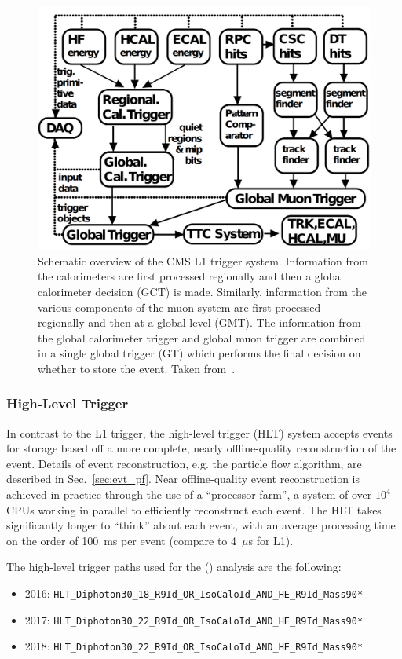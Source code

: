 \begin{figure} [htbp!]
    \centering
    \includegraphics[width=0.6\linewidth]{figures/cms/cms_l1_trigger.png}
    \caption[Schematic overview of the CMS L1 trigger system. Taken from~\cite{Khachatryan:2016bia}.]{Schematic overview of the CMS L1 trigger system. Information from the calorimeters are first processed regionally and then a global calorimeter decision (GCT) is made. Similarly, information from the various components of the muon system are first processed regionally and then at a global level (GMT). The information from the global calorimeter trigger and global muon trigger are combined in a single global trigger (GT) which performs the final decision on whether to store the event. Taken from~\cite{Khachatryan:2016bia}.}
    \label{fig:cms_l1_trigger}
\end{figure}

\subsubsection{High-Level Trigger}
In contrast to the L1 trigger, the high-level trigger (HLT) system accepts events for storage based off a more complete, nearly offline-quality reconstruction of the event.
Details of event reconstruction, e.g. the particle flow algorithm, are described in Sec.~\ref{sec:evt_pf}.
Near offline-quality event reconstruction is achieved in practice through the use of a ``processor farm'', a system of over $10^4$ CPUs working in parallel to efficiently reconstruct each event.
The HLT takes significantly longer to ``think'' about each event, with an average processing time on the order of 100~ms per event (compare to 4~$\mu$s for L1).

The high-level trigger paths used for the \ttH (\Hgg) analysis are the following:
\begin{itemize}
    \item 2016: \texttt{HLT\_Diphoton30\_18\_R9Id\_OR\_IsoCaloId\_AND\_HE\_R9Id\_Mass90*}
    \item 2017: \texttt{HLT\_Diphoton30\_22\_R9Id\_OR\_IsoCaloId\_AND\_HE\_R9Id\_Mass90*}
    \item 2018: \texttt{HLT\_Diphoton30\_22\_R9Id\_OR\_IsoCaloId\_AND\_HE\_R9Id\_Mass90*}
\end{itemize}

